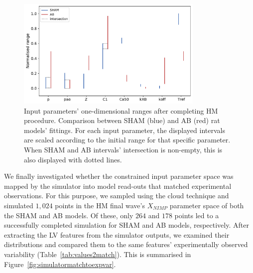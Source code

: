 \begin{figure}[!ht]
    \myfloatalign
    \includegraphics[width=0.8\textwidth]{figures/chapter04/sham_vs_ab_final_ranges.pdf}
    \caption{Input parameters’ one-dimensional ranges after completing HM procedure. Comparison between SHAM (blue) and AB (red) rat models’ fittings. For each input parameter, the displayed intervals are scaled according to the initial range for that specific parameter. When SHAM and AB intervals’ intersection is non-empty, this is also displayed with dotted lines.}
    \label{fig:onedspacered}
\end{figure}


\vspace{0.2cm}
We finally investigated whether the constrained input parameter space was mapped by the simulator into model read-outs that matched experimental observations. For this purpose, we sampled using the cloud technique and simulated $1,024$ points in the HM final wave's $X_{NIMP}$ parameter space of both the SHAM and AB models. Of these, only $264$ and $178$ points led to a successfully completed simulation for SHAM and AB models, respectively. After extracting the LV features from the simulator outputs, we examined their distributions and compared them to the same features' experimentally observed variability (Table~\ref{tab:values2match}). This is summarised in Figure~\ref{fig:simulatormatchtoexpvar}.

